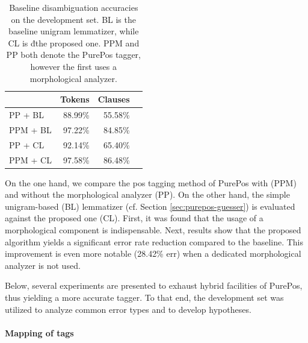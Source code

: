 \begin{table}[H]
\centering
\caption{Baseline disambiguation accuracies on the development set. BL is the baseline unigram lemmatizer, while CL is đthe proposed one. PPM and PP both denote the PurePos tagger, however the first uses a morphological analyzer.}\label{tab:oldhun-baselines}
\begin{tabular}{l r r r}
\hline
 & Tokens & Clauses \\
\hline
PP + BL  & 88.99\% & 55.58\% \\
PPM + BL  & 97.22\% & 84.85\% \\
PP + CL & 92.14\% & 65.40\% \\
PPM + CL & 97.58\% & 86.48\% \\
\hline
\end{tabular}
\end{table}


On the one hand, we compare the \gls{pos} tagging method of PurePos with (PPM) and without the morphological analyzer (PP).
On the other hand, the simple unigram-based (BL) lemmatizer (cf. Section \ref{sec:purepos-guesser}) is evaluated against the proposed one (CL). 
First, it was found that the usage of a morphological component is indispensable. 
Next, results show that the proposed algorithm yields a significant error rate reduction compared to the baseline. 
This improvement is even more notable  (28.42\% \acrshort{err}) when a dedicated morphological analyzer is not used.

Below, several experiments are presented to exhaust hybrid facilities of PurePos, thus yielding a more accurate tagger. 
To that end, the development set was utilized to analyze common error types and to develop hypotheses.

\paragraph{Mapping of tags}

